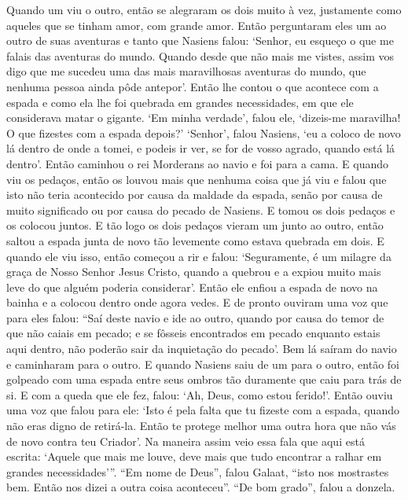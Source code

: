 Quando um viu o outro, então se alegraram os dois muito à vez, justamente como
aqueles que se tinham amor, com grande amor. Então perguntaram eles um ao outro
de suas aventuras e tanto que Nasiens falou: ‘Senhor, eu esqueço o que me
falais das aventuras do mundo. Quando desde que não mais me vistes, assim vos
digo que me sucedeu uma das mais maravilhosas aventuras do mundo, que nenhuma
pessoa ainda pôde antepor’. Então lhe contou o que acontece com a espada e como
ela lhe foi quebrada em grandes necessidades, em que ele considerava matar o
gigante. ‘Em minha verdade’, falou ele, ‘dizeis-me maravilha! O que fizestes
com a espada depois?’ ‘Senhor’, falou Nasiens, ‘eu a coloco de novo lá dentro
de onde a tomei, e podeis ir ver, se for de vosso agrado, quando está lá
dentro’. Então caminhou o rei Morderans ao navio e foi para a cama. E quando
viu os pedaços, então os louvou mais que nenhuma coisa que já viu e falou que
isto não teria acontecido por causa da maldade da espada, senão por causa de
muito significado ou por causa do pecado de Nasiens. E tomou os dois pedaços e
os colocou juntos. E tão logo os dois pedaços vieram um junto ao outro, então
saltou a espada junta de novo tão levemente como estava quebrada em dois. E
quando ele viu isso, então começou a rir e falou: ‘Seguramente, é um milagre da
graça de Nosso Senhor Jesus Cristo, quando a quebrou e a expiou muito mais leve
do que alguém poderia considerar’. Então ele enfiou a espada de novo na bainha
e a colocou dentro onde agora vedes. E de pronto ouviram uma voz que para eles
falou: “Saí deste navio e ide ao outro, quando por causa do temor de que não
caiais em pecado; e se fôsseis encontrados em pecado enquanto estais aqui
dentro, não poderão sair da inquietação do pecado’. Bem lá saíram do navio e
caminharam para o outro. E quando Nasiens saiu de um para o outro, então foi
golpeado com uma espada entre seus ombros tão duramente que caiu para trás de
si. E com a queda que ele fez, falou: ‘Ah, Deus, como estou ferido!’. Então
ouviu uma voz que falou para ele: ‘Isto é pela falta que tu fizeste com a
espada, quando não eras digno de retirá-la. Então te protege melhor uma outra
hora que não vás de novo contra teu Criador’. Na maneira assim veio essa fala
que aqui está escrita: ‘Aquele que mais me louve, deve mais que tudo encontrar
a ralhar em grandes necessidades’”. “Em nome de Deus”, falou
Galaat, “isto nos mostrastes bem. Então nos dizei a outra coisa aconteceu”. “De
bom grado”, falou a donzela.

